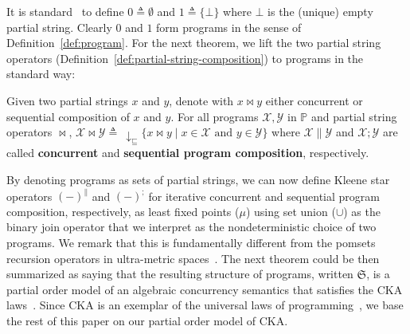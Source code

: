 \documentclass{llncs}
\newcommand{\set}[1]{\mbox{$\{ #1 \}$}}
\newcommand{\alt}{\mathrel{|}}
\newcommand{\deq}{\triangleq}
\newcommand{\cX}{\mathcal{X}}
\newcommand{\cY}{\mathcal{Y}}
\newcommand{\mfrS}{\mathfrak{S}}
\newcommand{\bbP}{\mathbb{P}}
\newcommand{\defn}[1]{\textbf{#1}}
\begin{document}
It is standard~\cite{G1988,HA2014} to define $0 \deq \emptyset$ and $1 \deq \set{\bot}$ where $\bot$ is the (unique) empty partial string. Clearly $0$ and $1$ form programs in the sense of Definition~\ref{def:program}. For the next theorem, we lift the two partial string operators (Definition~\ref{def:partial-string-composition}) to programs in the standard way:

\begin{definition}
\label{def:program-operator}
Given two partial strings $x$ and $y$, denote with $x \Join y$ either concurrent or sequential composition of $x$ and $y$. For all programs $\cX, \cY$ in $\bbP$ and partial string operators $\Join$, $\cX \Join \cY \deq\ \downarrow_\sqsubseteq \set{x \Join y \alt x \in \cX \text{ and } y \in \cY}$ where $\cX \parallel \cY$ and $\cX ; \cY$ are called \defn{concurrent} and \defn{sequential program composition}, respectively.
\end{definition}

By denoting programs as sets of partial strings, we can now define Kleene star operators $(-)^\parallel$ and $(-)^;$ for iterative concurrent and sequential program composition, respectively, as least fixed points ($\mu$) using set union ($\cup$) as the binary join operator that we interpret as the nondeterministic choice of two programs. We remark that this is fundamentally different from the pomsets recursion operators in ultra-metric spaces~\cite{BW1990}. The next theorem could be then summarized as saying that the resulting structure of programs, written $\mfrS$, is a partial order model of an algebraic concurrency semantics that satisfies the CKA laws~\cite{HMSW2011}. Since CKA is an exemplar of the universal laws of programming~\cite{HvS2014}, we base the rest of this paper on our partial order model of CKA.
\end{document}
